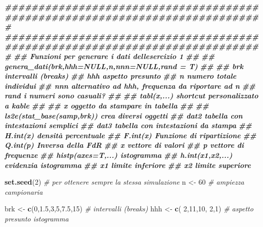 \documentclass[
  11pt,
]{book}
\newenvironment{Shaded}{\begin{snugshade}}{\end{snugshade}}
\newcommand{\CommentTok}[1]{\textcolor[rgb]{0.56,0.35,0.01}{\textit{#1}}}
\newcommand{\DecValTok}[1]{\textcolor[rgb]{0.00,0.00,0.81}{#1}}
\newcommand{\DocumentationTok}[1]{\textcolor[rgb]{0.56,0.35,0.01}{\textbf{\textit{#1}}}}
\newcommand{\FloatTok}[1]{\textcolor[rgb]{0.00,0.00,0.81}{#1}}
\newcommand{\FunctionTok}[1]{\textcolor[rgb]{0.13,0.29,0.53}{\textbf{#1}}}
\newcommand{\NormalTok}[1]{#1}
\newcommand{\OtherTok}[1]{\textcolor[rgb]{0.56,0.35,0.01}{#1}}
\theoremstyle{mytheoremstyle}
\theoremstyle{mydefstyle}
\begin{document}
\begin{Shaded}
\begin{Highlighting}[]
\DocumentationTok{\#\#\#\#\#\#\#\#\#\#\#\#\#\#\#\#\#\#\#\#\#\#\#\#\#\#\#\#\#\#\#\#\#\#\#\#\#\#\#\#\#\#\#\#\#\#\#\#\#\#\#\#\#\#\#\#\#\#\#\#\#\#\#\#\#\#\#\#\#\#\#\#\#\#\#\#\#}
\DocumentationTok{\#\#\#\#\#\#\#\#\#\#\#\#\#\#\#\#\#\#\#\#\#\#\#\#\#\#\#\#\#\#\#\#\#\#\#\#\#\#\#\#\#\#\#\#\#\#\#\#\#\#\#\#\#\#\#\#\#\#\#\#\#\#\#\#\#\#\#\#\#\#\#\#\#\#\#\#\#}
\DocumentationTok{\#\# Funzioni per generare i dati dell\textquotesingle{}esercizio 1}
\DocumentationTok{\#\#}
\DocumentationTok{\#\# genera\_dati(brk,hhh=NULL,n,nnn=NULL,rand = T)}
\DocumentationTok{\#\#}
\DocumentationTok{\#\#  brk      intervalli (breaks)}
\DocumentationTok{\#\#  hhh      aspetto presunto}
\DocumentationTok{\#\#  n        numero totale individui}
\DocumentationTok{\#\#  nnn      alternativo ad hhh, frequenza da riportare ad n}
\DocumentationTok{\#\#  rand     i numeri sono casuali?}
\DocumentationTok{\#\#}
\DocumentationTok{\#\# tabl(x,...)                   shortcut personalizzato a kable}
\DocumentationTok{\#\#}
\DocumentationTok{\#\#  x        oggetto da stampare in tabella}
\DocumentationTok{\#\#}
\DocumentationTok{\#\# ls2e(stat\_base(samp,brk))   crea diversi oggetti}
\DocumentationTok{\#\#  dat2     tabella con intestazioni semplici}
\DocumentationTok{\#\#  dat3     tabella con intestazioni da stampa}
\DocumentationTok{\#\#  H.int(x) densità percentuale}
\DocumentationTok{\#\#  F.int(x) Funzione di ripartizione}
\DocumentationTok{\#\#  Q.int(p) Inversa della FdR}
\DocumentationTok{\#\#    x      vettore di valori}
\DocumentationTok{\#\#    p      vettore di frequenze }
\DocumentationTok{\#\#  histp(axes=T,...) istogramma}
\DocumentationTok{\#\#  h.int(x1,x2,...)  evidenzia istogramma}
\DocumentationTok{\#\#    x1     limite inferiore}
\DocumentationTok{\#\#    x2     limite superiore}

\FunctionTok{set.seed}\NormalTok{(}\DecValTok{2}\NormalTok{)                      }\CommentTok{\# per ottenere sempre la stessa simulazione}
\NormalTok{n }\OtherTok{\textless{}{-}} \DecValTok{60}                          \CommentTok{\# ampiezza campionaria}

\NormalTok{brk  }\OtherTok{\textless{}{-}} \FunctionTok{c}\NormalTok{(}\DecValTok{0}\NormalTok{,}\FloatTok{1.5}\NormalTok{,}\DecValTok{3}\NormalTok{,}\DecValTok{5}\NormalTok{,}\FloatTok{7.5}\NormalTok{,}\DecValTok{15}\NormalTok{)      }\CommentTok{\# intervalli (breaks)}
\NormalTok{hhh  }\OtherTok{\textless{}{-}} \FunctionTok{c}\NormalTok{( }\DecValTok{2}\NormalTok{,}\DecValTok{11}\NormalTok{,}\DecValTok{10}\NormalTok{, }\DecValTok{2}\NormalTok{,}\DecValTok{1}\NormalTok{)         }\CommentTok{\# aspetto presunto istogramma}


\end{Highlighting}
\end{Shaded}
\end{document}
